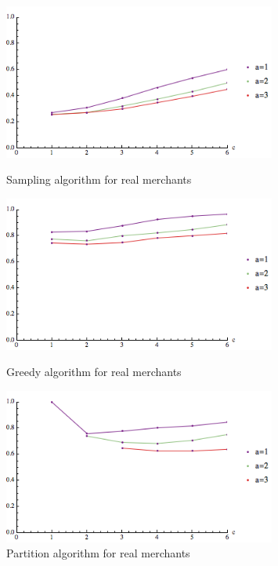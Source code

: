 \begin{figure}[t]
\centering
\begin{minipage}[h]{0.48\textwidth}
\centering
\includegraphics[width=0.8\textwidth]{images/real_sampling.png}
\caption{Sampling algorithm for real merchants}\label{fig:real_sampling}
\end{minipage}
\hspace{0cm}
\begin{minipage}[h]{0.48\textwidth}
\centering
\includegraphics[width=0.8\textwidth]{images/real_greedy.png}
\caption{Greedy algorithm for real merchants}\label{fig:real_greedy}
\end{minipage}
\hspace{0cm}
\centering
\begin{minipage}[h]{0.48\textwidth}
\centering
\includegraphics[width=0.8\textwidth]{images/real_partition.png}
\caption{Partition algorithm for real merchants}\label{fig:real_partition}
\end{minipage}
\vspace{-0.2in}
\end{figure}

